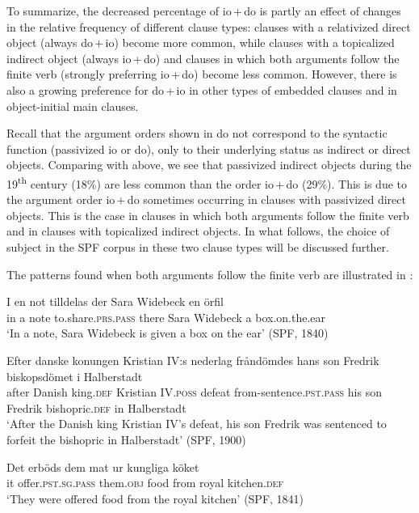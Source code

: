 \documentclass[output=paper]{langscibook}
\begin{document}
To summarize, the decreased percentage of io\,+\,do is partly an effect of changes in the relative frequency of different clause types: clauses with a relativized direct object (always do\,+\,io) become more common, while clauses with a topicalized indirect object (always io\,+\,do) and clauses in which both arguments follow the finite verb (strongly preferring io\,+\,do) become less common. However, there is also a growing preference for do\,+\,io in other types of embedded clauses and in object-initial main clauses.



Recall that the argument orders shown in  do not correspond to the syntactic function (passivized io or do), only to their underlying status as indirect or direct objects. Comparing with  above, we see that passivized indirect objects during the 19\textsuperscript{th} century (18\%) are less common than the order io\,+\,do (29\%). This is due to the argument order io\,+\,do sometimes occurring in clauses with passivized direct objects. This is the case in clauses in which both arguments follow the finite verb and in clauses with topicalized indirect objects. In what follows, the choice of subject in the SPF corpus in these two clause types will be discussed further.



The patterns found when both arguments follow the finite verb are illustrated in :


\ea%
    \label{ex:falk:20}
\ea\label{ex:falk:20a}
\gll I  en  not  tilldelas            der  Sara  Widebeck  en  örfil\\
      in  a  note  to.share\textsc{.prs}.\textsc{pass}    there  Sara  Widebeck  a  box.on.the.ear\\
\glt ‘In a note, Sara Widebeck is given a box on the ear’ (SPF, 1840)

\ex\label{ex:falk:20b}
\gll Efter  danske  konungen  Kristian IV:s    nederlag  fråndömdes      hans  son  Fredrik  biskopsdömet  i  Halberstadt\\
after  Danish  king.\textsc{def}    Kristian IV.\textsc{poss}  defeat      from-sentence.\textsc{pst}.\textsc{pass}      his   son  Fredrik  bishopric.\textsc{def}  in  Halberstadt\\
\glt ‘After the Danish king Kristian IV’s defeat, his son Fredrik was sentenced to forfeit the bishopric in Halberstadt’ (SPF, 1900)

\ex\label{ex:falk:20c}
\gll Det  erböds          dem        mat    ur    kungliga    köket\\
      it      offer.\textsc{pst.sg.pass}    them.\textsc{obj}  food  from  royal      kitchen.\textsc{def}\\
\glt ‘They were offered food from the royal kitchen’ (SPF, 1841)
\end{document}
